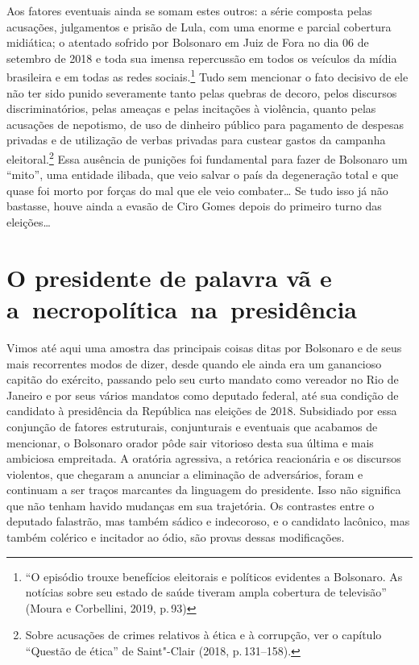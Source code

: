 Aos fatores eventuais ainda se somam estes outros: a série composta
pelas acusações, julgamentos e prisão de Lula, com uma enorme e parcial
cobertura midiática; o atentado sofrido por Bolsonaro em Juiz de Fora no
dia 06 de setembro de 2018 e toda sua imensa repercussão em todos os
veículos da mídia brasileira e em todas as redes sociais.\footnote{``O
  episódio trouxe benefícios eleitorais e políticos evidentes a
  Bolsonaro. As notícias sobre seu estado de saúde tiveram ampla
  cobertura de televisão'' (Moura e Corbellini, 2019, p.\,93)} Tudo sem
mencionar o fato decisivo de ele não ter sido punido severamente tanto
pelas quebras de decoro, pelos discursos discriminatórios, pelas ameaças
e pelas incitações à violência, quanto pelas acusações de nepotismo, de
uso de dinheiro público para pagamento de despesas privadas e de
utilização de verbas privadas para custear gastos da campanha
eleitoral.\footnote{Sobre acusações de crimes relativos à ética e à
  corrupção, ver o capítulo ``Questão de ética'' de Saint"-Clair (2018,
  p.\,131--158).} Essa ausência de punições foi fundamental para fazer de
Bolsonaro um ``mito'', uma entidade ilibada, que veio salvar o país da
degeneração total e que quase foi morto por forças do mal que ele veio
combater\ldots{} Se tudo isso já não bastasse, houve ainda a evasão de Ciro
Gomes depois do primeiro turno das eleições\ldots{}

\section{O presidente de palavra vã e a~necropolítica~na~presidência}

Vimos até aqui uma amostra das principais coisas ditas por Bolsonaro e
de seus mais recorrentes modos de dizer, desde quando ele ainda era um
ganancioso capitão do exército, passando pelo seu curto mandato como
vereador no Rio de Janeiro e por seus vários mandatos como deputado
federal, até sua condição de candidato à presidência da República nas
eleições de 2018. Subsidiado por essa conjunção de fatores estruturais,
conjunturais e eventuais que acabamos de mencionar, o Bolsonaro orador
pôde sair vitorioso desta sua última e mais ambiciosa empreitada. A
oratória agressiva, a retórica reacionária e os discursos violentos, que
chegaram a anunciar a eliminação de adversários, foram e continuam a ser
traços marcantes da linguagem do presidente. Isso não significa que não
tenham havido mudanças em sua trajetória. Os contrastes entre o deputado
falastrão, mas também sádico e indecoroso, e o candidato lacônico, mas
também colérico e incitador ao ódio, são provas dessas modificações.


